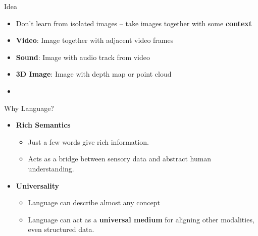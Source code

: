 \documentclass[serif, aspectratio=169]{beamer}
\begin{document}
\begin{frame}{Idea}
     
 \begin{itemize}
 \item  Don’t learn from isolated images -- take images together with some \textbf{context}
\item \textbf{Video}: Image together with adjacent video frames
 \item \textbf{Sound}: Image with audio track from video
 \item \textbf{3D Image}: Image with depth map or point cloud
\item  {}

  \end{itemize}
\end{frame}

\begin{frame}{Why Language?}
        \begin{itemize}
          \item \textbf{Rich Semantics}
          \begin{itemize}
              \item Just a few words give rich information.
              \item Acts as a bridge between sensory data and abstract human understanding.
          \end{itemize}
          
          \item  \textbf{Universality}
          \begin{itemize}
              \item Language can describe almost any concept
              \item Language can act as a \textbf{universal medium} for aligning other modalities, even structured data.
          \end{itemize} 
        \end{itemize}
\end{frame}
\end{document}
